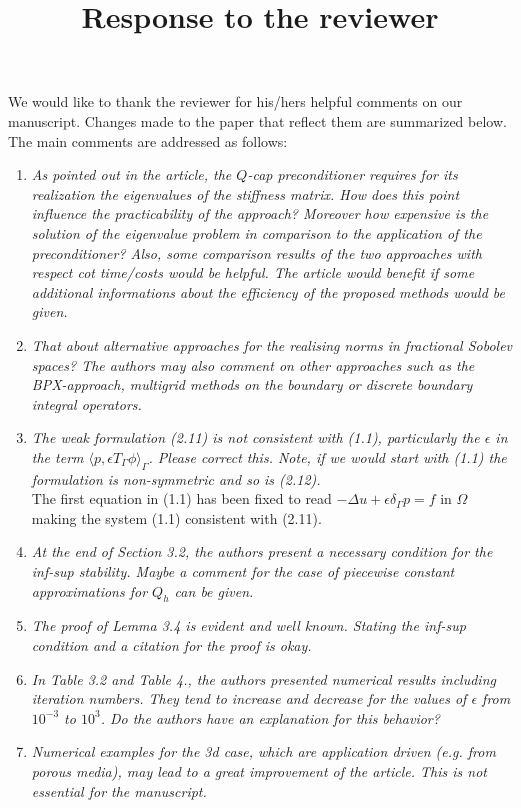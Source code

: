 \documentclass[10pt, a4paper]{article}
\title{\large{Response to the reviewer}}
\date{}
\renewcommand{\brack}[1]{\langle#1\rangle}
\begin{document}
\maketitle

We would like to thank the reviewer for his/hers helpful comments on our manuscript. 
Changes made to the paper that reflect them are summarized below. The main
comments are addressed as follows:

\begin{enumerate}
  \item{\textit{As pointed out in the article, the $Q$-cap preconditioner
    requires for its realization the eigenvalues of the stiffness matrix. How
    does this point influence the practicability of the approach? Moreover how
    expensive is the solution of the eigenvalue problem in comparison to the
    application of the preconditioner? Also, some comparison results of the two
    approaches with respect cot time/costs would be helpful. The article would
    benefit if some additional informations about the efficiency of the proposed
    methods would be given.
    }
}
  \item{\textit{That about alternative approaches for the realising norms in
    fractional Sobolev spaces? The authors may also comment on other approaches
    such as the BPX-approach, multigrid methods on the boundary or discrete
    boundary integral operators.}
    }
  \item{\textit{The weak formulation (2.11) is not consistent with (1.1),
    particularly the $\epsilon$ in the term $\brack{p, \epsilon T_\Gamma
    \phi}_{\Gamma}$. Please correct this. Note, if we would start with (1.1) the
    formulation is non-symmetric and so is (2.12).}\\
    The first equation in (1.1) has been fixed to read 
    $-\Delta u + \epsilon\delta_{\Gamma} p= f \mbox{ in } \Omega$ making the
    system (1.1) consistent with (2.11). 
}
  \item{\textit{At the end of Section 3.2, the authors present a necessary
    condition for the inf-sup stability. Maybe a comment for the case of
    piecewise constant approximations for $Q_h$ can be given.}
}
  \item{\textit{The proof of Lemma 3.4 is evident and well known. Stating the
    inf-sup condition and a citation for the proof is okay.}
}
  \item{\textit{In Table 3.2 and Table 4., the authors presented numerical
    results including iteration numbers. They tend to increase and decrease for
    the values of $\epsilon$ from $10^{-3}$ to $10^{3}$. Do the authors have an
    explanation for this behavior?}
}
  \item{\textit{Numerical examples for the 3d case, which are application driven
    (e.g. from porous media), may lead to a great improvement of the article.
    This is not essential for the manuscript.}
}
\end{enumerate}
\end{document}
